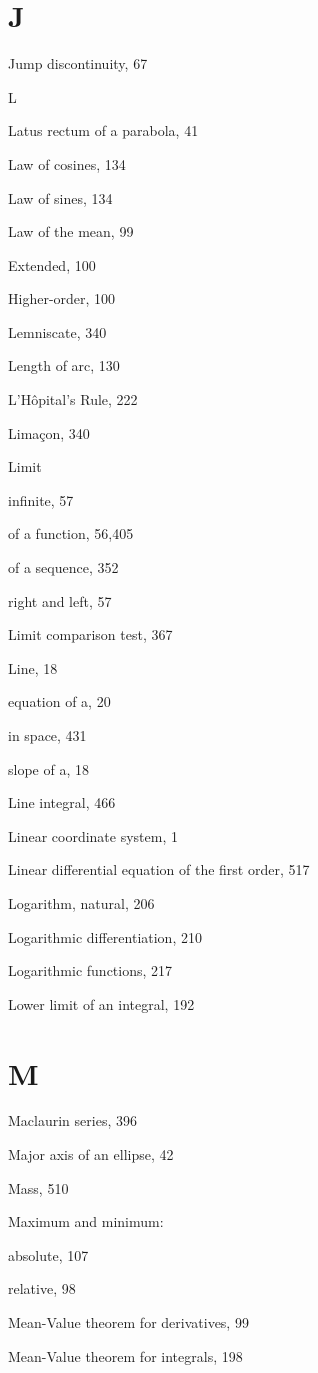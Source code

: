 \documentclass[10pt]{article}
\begin{document}
\section*{J}
Jump discontinuity, 67

L

Latus rectum of a parabola, 41

Law of cosines, 134

Law of sines, 134

Law of the mean, 99

Extended, 100

Higher-order, 100

Lemniscate, 340

Length of arc, 130

L'Hôpital's Rule, 222

Limaçon, 340

Limit

infinite, 57

of a function, 56,405

of a sequence, 352

right and left, 57

Limit comparison test, 367

Line, 18

equation of a, 20

in space, 431

slope of a, 18

Line integral, 466

Linear coordinate system, 1

Linear differential equation of the first order, 517

Logarithm, natural, 206

Logarithmic differentiation, 210

Logarithmic functions, 217

Lower limit of an integral, 192

\section*{M}
Maclaurin series, 396

Major axis of an ellipse, 42

Mass, 510

Maximum and minimum:

absolute, 107

relative, 98

Mean-Value theorem for derivatives, 99

Mean-Value theorem for integrals, 198
\end{document}
